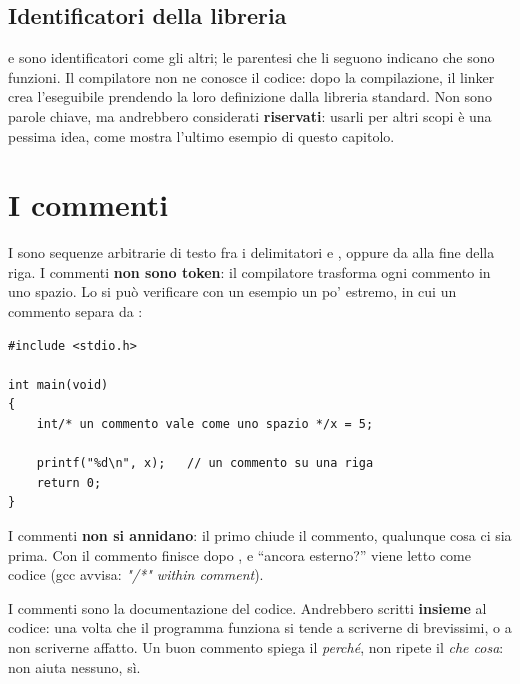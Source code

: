\subsection{Identificatori della libreria}

 e  sono identificatori come gli altri; le
parentesi che li seguono indicano che sono funzioni. Il compilatore non ne
conosce il codice: dopo la compilazione, il linker crea l'eseguibile
prendendo la loro definizione dalla libreria standard. Non sono parole
chiave, ma andrebbero considerati \textbf{riservati}: usarli per altri scopi
è una pessima idea, come mostra l'ultimo esempio di questo capitolo.

\section{I commenti}

I  sono sequenze arbitrarie di testo fra i delimitatori
\code{/*} e \code{*/}, oppure da \code{//} alla fine della riga. I commenti
\textbf{non sono token}: il compilatore trasforma ogni commento in uno
spazio. Lo si può verificare con un esempio un po' estremo, in cui un
commento separa  da :

\begin{affianco}[0.6][c]
\begin{lstlisting}[style=c, name=commenti.c]
#include <stdio.h>

int main(void)
{
    int/* un commento vale come uno spazio */x = 5;

    printf("%d\n", x);   // un commento su una riga
    return 0;
}
\end{lstlisting}
\risultato
{}
\end{affianco}

I commenti \code{/* */} \textbf{non si annidano}: il primo \code{*/}
chiude il commento, qualunque cosa ci sia prima. Con
 il commento finisce dopo
, e “ancora esterno?” viene letto come codice (gcc avvisa:
\textit{"/*" within comment}).

I commenti sono la documentazione del codice. Andrebbero scritti
\textbf{insieme} al codice: una volta che il programma funziona si tende a
scriverne di brevissimi, o a non scriverne affatto. Un buon commento spiega
il \textit{perché}, non ripete il \textit{che cosa}:  non aiuta nessuno,  sì.

